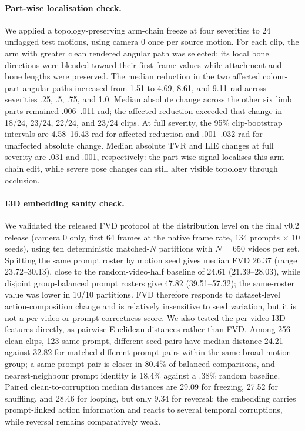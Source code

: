 \documentclass[10pt,twocolumn]{article}
\begin{document}
\paragraph{Part-wise localisation check.} We applied a topology-preserving arm-chain freeze at four
severities to 24 unflagged test motions, using camera 0 once per source motion. For each clip, the arm with
greater clean rendered angular path was selected; its local bone directions were blended toward their
first-frame values while attachment and bone lengths were preserved. The median reduction in the two
affected colour-part angular paths increased from 1.51 to 4.69, 8.61, and 9.11 rad across severities .25,
.5, .75, and 1.0. Median absolute change across the other six limb parts remained .006--.011 rad; the
affected reduction exceeded that change in 18/24, 23/24, 22/24, and 23/24 clips. At full severity, the
95\% clip-bootstrap intervals are 4.58--16.43 rad for affected reduction and .001--.032 rad for unaffected
absolute change. Median absolute TVR and LIE changes at full severity are .031 and .001, respectively: the
part-wise signal localises this arm-chain edit, while severe pose changes can still alter visible topology
through occlusion.

\paragraph{I3D embedding sanity check.} We validated the released FVD protocol at the distribution level on
the final v0.2 release (camera 0 only, first 64 frames at the native frame rate, 134 prompts $\times$ 10
seeds), using ten deterministic matched-$N$ partitions with $N{=}650$ videos per set. Splitting the same
prompt roster by motion seed gives median FVD 26.37 (range 23.72--30.13), close to the random-video-half
baseline of 24.61 (21.39--28.03), while disjoint group-balanced prompt rosters give 47.82 (39.51--57.32);
the same-roster value was lower in 10/10 partitions. FVD therefore responds to dataset-level
action-composition change and is relatively insensitive to seed variation, but it is not a per-video or
prompt-correctness score. We also tested the per-video I3D features directly, as pairwise Euclidean
distances rather than FVD. Among 256 clean clips, 123 same-prompt, different-seed pairs have median
distance 24.21 against 32.82 for matched different-prompt pairs within the same broad motion group; a
same-prompt pair is closer in 80.4\% of balanced comparisons, and nearest-neighbour prompt identity is
18.4\% against a .38\% random baseline. Paired clean-to-corruption median distances are 29.09 for freezing,
27.52 for shuffling, and 28.46 for looping, but only 9.34 for reversal: the embedding carries prompt-linked
action information and reacts to several temporal corruptions, while reversal remains comparatively weak.
\end{document}

